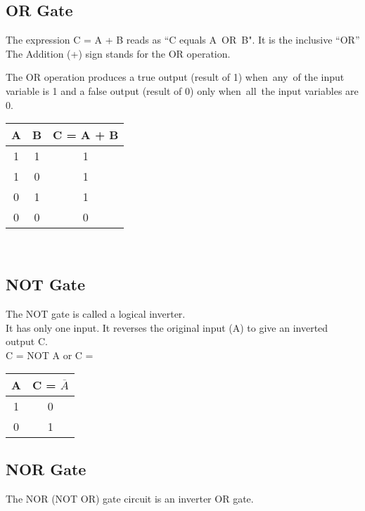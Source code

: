 \documentclass{article}
\begin{document}
\subsection{OR Gate}
The expression C = A + B reads as “C equals A OR B". It is the inclusive “OR”
The Addition (+) sign stands for the OR operation. 

The OR operation produces a true output (result of 1) when any of the input variable is 1 and a false output (result of 0) only when all the input variables are 0. 
\begin{table}[h!]
	\begin{center}
		\begin{tabular}{c|c|c}
			\textbf{A} & \textbf{B} &
			\textbf{C = A + B}\\
			\hline
			1 & 1 & 1\\
			\hline
			1 & 0 & 1\\
			\hline
			0 & 1 & 1\\
			\hline
			0 & 0 & 0\\
			\hline
		\end{tabular}
	\end{center}
\end{table} \\ 


\subsection{NOT Gate}
The NOT gate is called a logical inverter. \\
It has only one input. It reverses the original input (A) to give an inverted output C. \\

\color{red}C = NOT A or C = \\ \color{black}
\begin{table}[h!]
	\begin{center}
		\begin{tabular}{c|c}
			\textbf{A} & 
			\textbf{C = $\overline{A}$}\\
			\hline
			1 & 0 \\
			\hline
			0 & 1 \\
			\hline
		\end{tabular}
	\end{center}
\end{table} 


\subsection{NOR Gate}
The NOR (NOT OR) gate circuit is an inverter OR gate. \\
\end{document}
